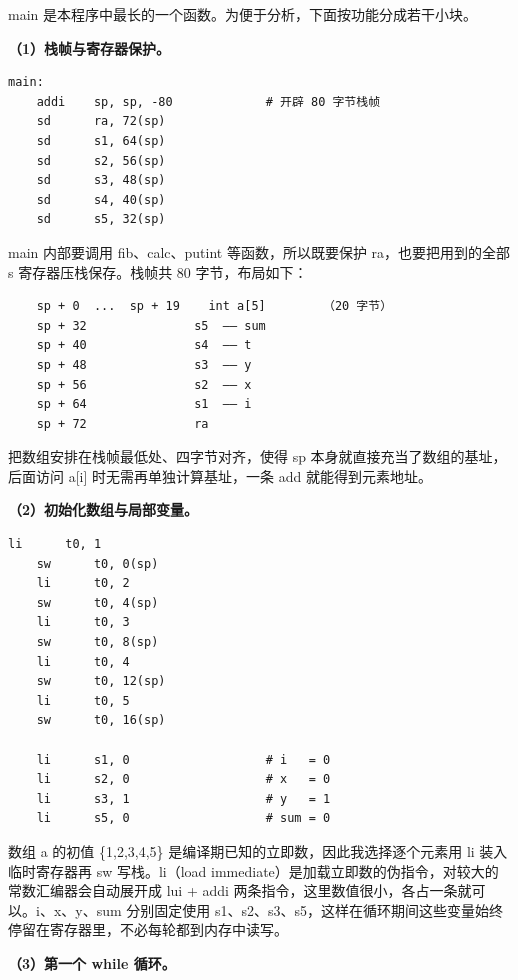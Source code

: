 \documentclass[UTF8,a4paper,10pt]{ctexart}
\newcommand{\hfour}[1]{\par\vspace{0.55em}\noindent{\bfseries #1}\par\vspace{0.25em}}
\begin{document}
\hfour{5. 函数 main}

main 是本程序中最长的一个函数。为便于分析，下面按功能分成若干小块。

\textbf{（1）栈帧与寄存器保护。}

\begin{lstlisting}[language=riscv]
main:
    addi    sp, sp, -80             # 开辟 80 字节栈帧
    sd      ra, 72(sp)
    sd      s1, 64(sp)
    sd      s2, 56(sp)
    sd      s3, 48(sp)
    sd      s4, 40(sp)
    sd      s5, 32(sp)
\end{lstlisting}

main 内部要调用 fib、calc、putint 等函数，所以既要保护 ra，也要把用到的全部 s 寄存器压栈保存。栈帧共 80 字节，布局如下：

\begin{lstlisting}
    sp + 0  ...  sp + 19    int a[5]        （20 字节）
    sp + 32               s5  —— sum
    sp + 40               s4  —— t
    sp + 48               s3  —— y
    sp + 56               s2  —— x
    sp + 64               s1  —— i
    sp + 72               ra
\end{lstlisting}

把数组安排在栈帧最低处、四字节对齐，使得 sp 本身就直接充当了数组的基址，后面访问 a[i] 时无需再单独计算基址，一条 add 就能得到元素地址。

\textbf{（2）初始化数组与局部变量。}

\begin{lstlisting}[language=riscv]
    li      t0, 1
    sw      t0, 0(sp)
    li      t0, 2
    sw      t0, 4(sp)
    li      t0, 3
    sw      t0, 8(sp)
    li      t0, 4
    sw      t0, 12(sp)
    li      t0, 5
    sw      t0, 16(sp)

    li      s1, 0                   # i   = 0
    li      s2, 0                   # x   = 0
    li      s3, 1                   # y   = 1
    li      s5, 0                   # sum = 0
\end{lstlisting}

数组 a 的初值 \{1,2,3,4,5\} 是编译期已知的立即数，因此我选择逐个元素用 li 装入临时寄存器再 sw 写栈。li（load immediate）是加载立即数的伪指令，对较大的常数汇编器会自动展开成 lui + addi 两条指令，这里数值很小，各占一条就可以。i、x、y、sum 分别固定使用 s1、s2、s3、s5，这样在循环期间这些变量始终停留在寄存器里，不必每轮都到内存中读写。

\textbf{（3）第一个 while 循环。}
\end{document}
